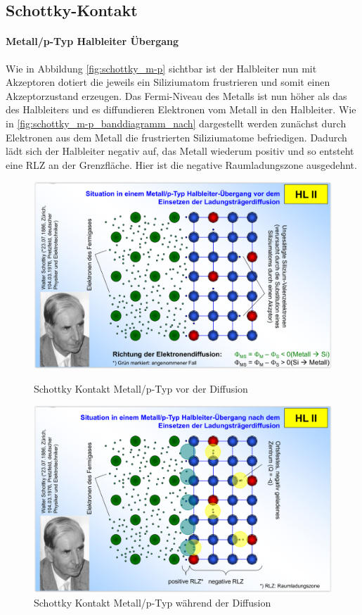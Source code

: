 \documentclass[12pt,a4paper]{report}%
\numberwithin{equation}{section}
\newcommand{\subsubsubsection}{\paragraph}
\numberwithin{equation}{subsection}
\begin{document}
	  \subsection{Schottky-Kontakt}
			\subsubsubsection{Metall/p-Typ Halbleiter Übergang}
			 Wie in Abbildung \ref{fig:schottky_m-p} sichtbar ist der Halbleiter nun mit Akzeptoren dotiert die jeweils ein Siliziumatom frustrieren und somit einen Akzeptorzustand erzeugen. Das Fermi-Niveau des Metalls ist nun höher als das des Halbleiters und es diffundieren Elektronen vom Metall in den Halbleiter. Wie in \ref{fig:schottky_m-p_banddiagramm_nach} dargestellt werden zunächst durch Elektronen aus dem Metall die frustrierten Siliziumatome befriedigen. Dadurch lädt sich der Halbleiter negativ auf, das Metall wiederum positiv und so entsteht eine RLZ an der Grenzfläche. Hier ist die negative Raumladungszone ausgedehnt.
			\begin{figure}[H] 
				\centering
				\begin{minipage}{.5\textwidth}
				  \centering
				  \captionsetup{justification=centering}
				  \includegraphics[width=0.95\linewidth]{schottky_m-p_vorher.png}
				  \caption{Schottky Kontakt Metall/p-Typ vor der Diffusion \protect\cite{MIKRO2}}
				  \label{fig:schottky_m-p}
				\end{minipage}%
				\begin{minipage}{.5\textwidth}
				  \centering
				  \captionsetup{justification=centering}
				  \includegraphics[width=0.95\linewidth]{schottky_m-p_nachher.png}
				  \caption{Schottky Kontakt Metall/p-Typ während der Diffusion \protect\cite{MIKRO2}}
				  \label{fig:schottky_m-p_diff}
				\end{minipage}
		  \end{figure}
\end{document}
